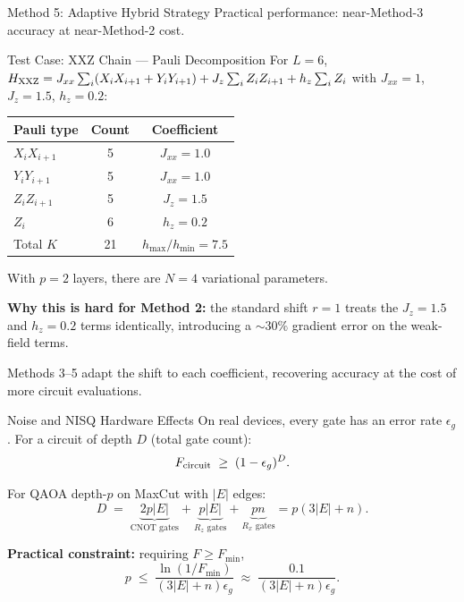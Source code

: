 \documentclass{beamer}
\begin{document}
\begin{frame}
\begin{frame}{Method 5: Adaptive Hybrid Strategy}
Practical performance: near-Method-3 accuracy at near-Method-2 cost.
\end{frame}


\begin{frame}{Test Case: XXZ Chain — Pauli Decomposition}
For $L=6$, $H_{\rm XXZ} = J_{xx}\sum_i(X_iX_{i+1}+Y_iY_{i+1})
+ J_z\sum_iZ_iZ_{i+1} + h_z\sum_i Z_i$
with $J_{xx}=1$, $J_z=1.5$, $h_z=0.2$:

\medskip
\begin{center}
\small
\begin{tabular}{lcc}
\hline
Pauli type & Count & Coefficient \\
\hline
$X_iX_{i+1}$ & 5 & $J_{xx} = 1.0$ \\
$Y_iY_{i+1}$ & 5 & $J_{xx} = 1.0$ \\
$Z_iZ_{i+1}$ & 5 & $J_z = 1.5$ \\
$Z_i$        & 6 & $h_z = 0.2$ \\
\hline
Total $K$ & 21 & $h_{\max}/h_{\min} = 7.5$ \\
\hline
\end{tabular}
\end{center}

\medskip
With $p=2$ layers, there are $N=4$ variational parameters.

\textbf{Why this is hard for Method 2:} the standard shift $r=1$
treats the $J_z=1.5$ and $h_z=0.2$ terms identically, introducing
a $\sim 30\%$ gradient error on the weak-field terms.

Methods 3--5 adapt the shift to each coefficient, recovering accuracy
at the cost of more circuit evaluations.
\end{frame}


\begin{frame}{Noise and NISQ Hardware Effects}
On real devices, every gate has an error rate $\epsilon_g$.
For a circuit of depth $D$ (total gate count):
\[
F_{\rm circuit} \;\ge\; (1-\epsilon_g)^D.
\]

For QAOA depth-$p$ on MaxCut with $|E|$ edges:
\[
D \;=\; \underbrace{2p|E|}_{\text{CNOT gates}}
+ \underbrace{p|E|}_{\text{$R_z$ gates}}
+ \underbrace{pn}_{\text{$R_x$ gates}}
= p(3|E|+n).
\]

\medskip

\textbf{Practical constraint:} requiring $F\ge F_{\min}$,
\[
p \;\le\; \frac{\ln(1/F_{\min})}{(3|E|+n)\epsilon_g}
\;\approx\; \frac{0.1}{(3|E|+n)\epsilon_g}.
\]


\end{frame}
\end{frame}
\end{document}
